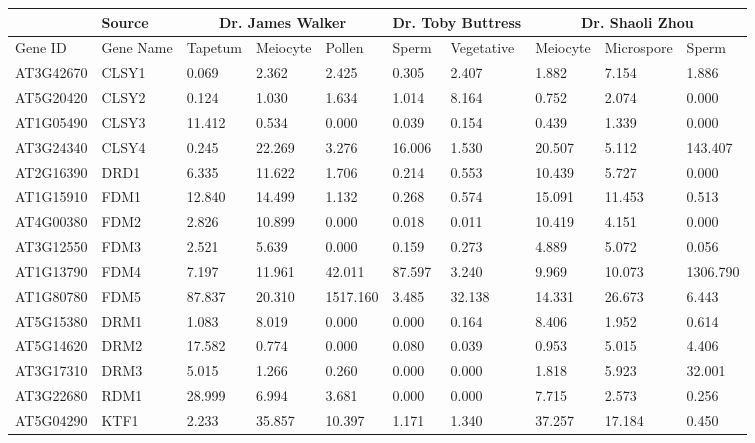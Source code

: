 \begin{landscape}
\small
\begin{longtable}{l|l|lll|ll|lll}
 &
  Source &
  \multicolumn{3}{c|}{Dr. James Walker} &
  \multicolumn{2}{c|}{Dr. Toby Buttress} &
  \multicolumn{3}{c}{Dr. Shaoli Zhou} \\ \hline
\endfirsthead
%
\endhead
%
Gene ID &
  Gene Name &
  Tapetum &
  Meiocyte &
  Pollen &
  Sperm &
  Vegetative &
  Meiocyte &
  Microspore &
  Sperm \\ \hline
AT3G42670 & CLSY1    & 0.069  & 2.362   & 2.425    & 0.305  & 2.407    & 1.882   & 7.154  & 1.886    \\
AT5G20420 & CLSY2    & 0.124  & 1.030   & 1.634    & 1.014  & 8.164    & 0.752   & 2.074  & 0.000    \\
AT1G05490 & CLSY3    & 11.412 & 0.534   & 0.000    & 0.039  & 0.154    & 0.439   & 1.339  & 0.000    \\
AT3G24340 & CLSY4    & 0.245  & 22.269  & 3.276    & 16.006 & 1.530    & 20.507  & 5.112  & 143.407  \\ \hline
AT2G16390 & DRD1     & 6.335  & 11.622  & 1.706    & 0.214  & 0.553    & 10.439  & 5.727  & 0.000    \\ \hline
AT1G15910 & FDM1     & 12.840 & 14.499  & 1.132    & 0.268  & 0.574    & 15.091  & 11.453 & 0.513    \\
AT4G00380 & FDM2     & 2.826  & 10.899  & 0.000    & 0.018  & 0.011    & 10.419  & 4.151  & 0.000    \\
AT3G12550 & FDM3     & 2.521  & 5.639   & 0.000    & 0.159  & 0.273    & 4.889   & 5.072  & 0.056    \\
AT1G13790 & FDM4     & 7.197  & 11.961  & 42.011   & 87.597 & 3.240    & 9.969   & 10.073 & 1306.790 \\
AT1G80780 & FDM5     & 87.837 & 20.310  & 1517.160 & 3.485  & 32.138   & 14.331  & 26.673 & 6.443    \\ \hline
AT5G15380 & DRM1     & 1.083  & 8.019   & 0.000    & 0.000  & 0.164    & 8.406   & 1.952  & 0.614    \\
AT5G14620 & DRM2     & 17.582 & 0.774   & 0.000    & 0.080  & 0.039    & 0.953   & 5.015  & 4.406    \\
AT3G17310 & DRM3     & 5.015  & 1.266   & 0.260    & 0.000  & 0.000    & 1.818   & 5.923  & 32.001   \\
AT3G22680 & RDM1     & 28.999 & 6.994   & 3.681    & 0.000  & 0.000    & 7.715   & 2.573  & 0.256    \\ \hline
AT5G04290 & KTF1     & 2.233  & 35.857  & 10.397   & 1.171  & 1.340    & 37.257  & 17.184 & 0.450    \\

\end{longtable}
\end{landscape}
